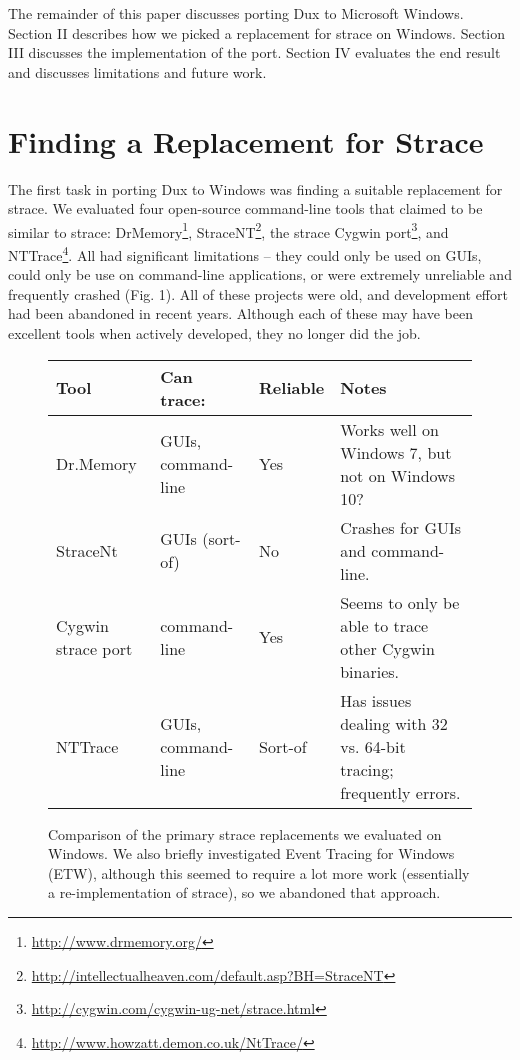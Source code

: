 \documentclass[10pt,conference]{IEEEtran}
\begin{document}
The remainder of this paper discusses porting Dux to Microsoft Windows. Section II
describes how we picked a replacement for strace on Windows. Section 
III discusses the implementation of the port. Section IV evaluates the end result
and discusses limitations and future work.

\section{Finding a Replacement for Strace} 

The first task in porting Dux to Windows was finding a suitable replacement
for strace. We evaluated four open-source command-line tools that claimed to be
similar to strace: DrMemory\footnote{\url{http://www.drmemory.org/}},
StraceNT\footnote{\url{http://intellectualheaven.com/default.asp?BH=StraceNT}},
the strace Cygwin port\footnote{\url{http://cygwin.com/cygwin-ug-net/strace.html}},
and NTTrace\footnote{\url{http://www.howzatt.demon.co.uk/NtTrace/}}. 
All had significant limitations -- they could only be used on GUIs, could only
be use on command-line applications, or were extremely unreliable and frequently
crashed (Fig. 1). All of these projects were old, and development effort had been
abandoned in recent years. Although each of these may have been excellent tools
when actively developed, they no longer did the job.

\begin{figure}
\begin{center}
\begin{tabular}{ |p{1.6cm}|p{1.5cm}|p{1 cm}|p{3 cm}|}
 \hline
 Tool & Can trace: & Reliable & Notes \\ \hline \hline
 Dr.Memory & GUIs, command-line & Yes & Works well on Windows 7, but not on Windows 10? \\ \hline
 StraceNt & GUIs (sort-of) & No & Crashes for GUIs and command-line. \\ \hline
Cygwin strace port & command-line & Yes & Seems to only be able to trace other Cygwin binaries. \\ \hline
NTTrace & GUIs, command-line & Sort-of & Has issues dealing with 32 vs. 64-bit tracing; frequently errors. \\
 \hline
\end{tabular}
\end{center}
\caption{Comparison of the primary strace replacements we evaluated on Windows.
We also briefly investigated Event Tracing for Windows (ETW), although this seemed
to require a lot more work (essentially a re-implementation of strace), so we
abandoned that approach.}
\end{figure}
\end{document}
